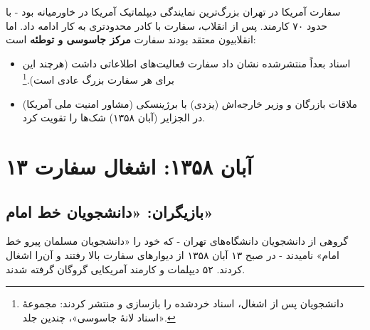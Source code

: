 \documentclass[12pt,a4paper]{book}
\newcommand{\keyword}[1]{\textbf{\textcolor{cPrimary}{#1}}}
\begin{document}
سفارت آمریکا در تهران بزرگ‌ترین نمایندگی دیپلماتیک آمریکا در خاورمیانه بود - با حدود ۷۰ کارمند. پس از انقلاب، سفارت با کادر محدودتری به کار ادامه داد. اما انقلابیون معتقد بودند سفارت \keyword{مرکز جاسوسی و توطئه} است:

\begin{itemize}[label=\textcolor{cAccent}{$\blacktriangleright$}, rightmargin=2em]
    \item اسناد بعداً منتشرشده نشان داد سفارت فعالیت‌های اطلاعاتی داشت (هرچند این برای هر سفارت بزرگ عادی است).\footnote{دانشجویان پس از اشغال، اسناد خردشده را بازسازی و منتشر کردند: مجموعهٔ «اسناد لانهٔ جاسوسی»، چندین جلد.}
    \item ملاقات بازرگان و وزیر خارجه‌اش (یزدی) با برژینسکی (مشاور امنیت ملی آمریکا) در الجزایر (آبان ۱۳۵۸) شک‌ها را تقویت کرد.
\end{itemize}

\section{۱۳ آبان ۱۳۵۸: اشغال سفارت}

\subsection{بازیگران: «دانشجویان خط امام»}

گروهی از دانشجویان دانشگاه‌های تهران - که خود را «دانشجویان مسلمان پیرو خط امام» نامیدند - در صبح ۱۳ آبان ۱۳۵۸ از دیوارهای سفارت بالا رفتند و آن‌را اشغال کردند. ۵۲ دیپلمات و کارمند آمریکایی گروگان گرفته شدند.
\end{document}
